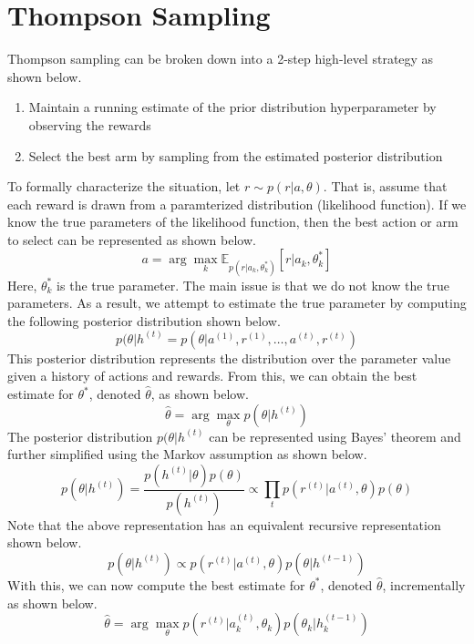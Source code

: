 \documentclass[11pt]{article}
\begin{document}




\section{Thompson Sampling}
Thompson sampling can be broken down into a 2-step high-level strategy as shown below.
\begin{enumerate}
    \item Maintain a running estimate of the prior distribution hyperparameter by observing the rewards
    \item Select the best arm by sampling from the estimated posterior distribution
\end{enumerate}
To formally characterize the situation, let $r \sim p(r|a,\theta)$. That is, assume that each reward is drawn from a paramterized distribution (likelihood function). If we know the true parameters of the likelihood function, then the best action or arm to select can be represented as shown below.
\[ a = \arg\max_k \mathbb{E}_{p(r|a_k,\theta^*_k)}[r|a_k,\theta^*_k] \]
Here, $\theta_k^*$ is the true parameter. The main issue is that we do not know the true parameters. As a result, we attempt to estimate the true parameter by computing the following posterior distribution shown below.
\[ p(\theta|h^{(t)} = p(\theta|a^{(1)}, r^{(1)}, \ldots, a^{(t)}, r^{(t)}) \]
This posterior distribution represents the distribution over the parameter value given a history of actions and rewards. From this, we can obtain the best estimate for $\theta^*$, denoted $\hat{\theta}$, as shown below.
\[ \hat{\theta} = \arg\max_\theta p(\theta|h^{(t)}) \]
The posterior distribution $ p(\theta|h^{(t)}$ can be represented using Bayes' theorem and further simplified using the Markov assumption as shown below.
\[  p(\theta|h^{(t)}) = \frac{p(h^{(t)}|\theta)p(\theta)}{p(h^{(t)})} \propto \prod_t p(r^{(t)}|a^{(t)},\theta)p(\theta) \]
Note that the above representation has an equivalent recursive representation shown below.
\[ p(\theta|h^{(t)}) \propto p(r^{(t)}|a^{(t)},\theta)p(\theta|h^{(t-1)}) \]
With this, we can now compute the best estimate for $\theta^*$, denoted $\hat{\theta}$, incrementally as shown below.
\[ \hat{\theta} = \arg\max_\theta p(r^{(t)}|a_k^{(t)},\theta_k)p(\theta_k|h_k^{(t-1)}) \]
\end{document}
